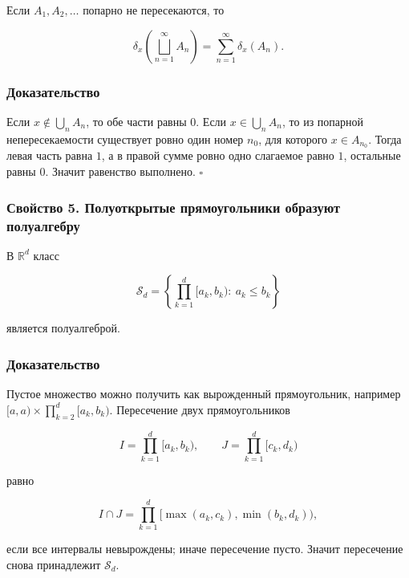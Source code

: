 \documentclass[
  11pt,
  a4paper,
]{article}
\begin{document}
Если \(A_1,A_2,\ldots\) попарно не пересекаются, то

\[
\delta_x\left(\bigsqcup_{n=1}^{\infty}A_n\right)=\sum_{n=1}^{\infty}\delta_x(A_n).
\]

\subsubsection{Доказательство}\label{ux434ux43eux43aux430ux437ux430ux442ux435ux43bux44cux441ux442ux432ux43e-3}

Если \(x\notin\bigcup_n A_n\), то обе части равны \(0\). Если
\(x\in\bigcup_n A_n\), то из попарной непересекаемости существует ровно
один номер \(n_0\), для которого \(x\in A_{n_0}\). Тогда левая часть
равна \(1\), а в правой сумме ровно одно слагаемое равно \(1\),
остальные равны \(0\). Значит равенство выполнено. \(\square\)

\subsubsection{Свойство 5. Полуоткрытые прямоугольники образуют
полуалгебру}\label{ux441ux432ux43eux439ux441ux442ux432ux43e-5.-ux43fux43eux43bux443ux43eux442ux43aux440ux44bux442ux44bux435-ux43fux440ux44fux43cux43eux443ux433ux43eux43bux44cux43dux438ux43aux438-ux43eux431ux440ux430ux437ux443ux44eux442-ux43fux43eux43bux443ux430ux43bux433ux435ux431ux440ux443}

В \(\mathbb R^d\) класс

\[
\mathcal S_d=\left\{\prod_{k=1}^d[a_k,b_k):\ a_k\le b_k\right\}
\]

является полуалгеброй.

\subsubsection{Доказательство}\label{ux434ux43eux43aux430ux437ux430ux442ux435ux43bux44cux441ux442ux432ux43e-4}

Пустое множество можно получить как вырожденный прямоугольник, например
\([a,a)\times\prod_{k=2}^d[a_k,b_k)\). Пересечение двух прямоугольников

\[
I=\prod_{k=1}^d[a_k,b_k),\qquad J=\prod_{k=1}^d[c_k,d_k)
\]

равно

\[
I\cap J=\prod_{k=1}^d[\max(a_k,c_k),\min(b_k,d_k)),
\]

если все интервалы невырождены; иначе пересечение пусто. Значит
пересечение снова принадлежит \(\mathcal S_d\).
\end{document}
